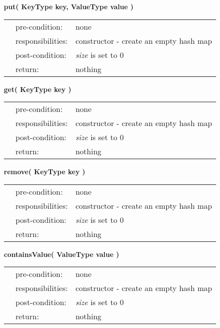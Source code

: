 \documentclass[12pt,letterpaper]{article}
\begin{document}
\textbf{put( KeyType key, ValueType value )} \\
\begin{listliketab} 
        \begin{tabular}{Lll}
            & pre-condition:    & none \\
            & responsibilities: & constructor - create an empty hash map \\
            & post-condition:   & \emph{size} is set to 0 \\
            & return:           & nothing
        \end{tabular} 
    \end{listliketab}
    
\textbf{get( KeyType key )} \\
\begin{listliketab} 
        \begin{tabular}{Lll}
            & pre-condition:    & none \\
            & responsibilities: & constructor - create an empty hash map \\
            & post-condition:   & \emph{size} is set to 0 \\
            & return:           & nothing
        \end{tabular} 
    \end{listliketab}
    
\textbf{remove( KeyType key )} \\
\begin{listliketab} 
        \begin{tabular}{Lll}
            & pre-condition:    & none \\
            & responsibilities: & constructor - create an empty hash map \\
            & post-condition:   & \emph{size} is set to 0 \\
            & return:           & nothing
        \end{tabular} 
    \end{listliketab}
    
\textbf{containsValue( ValueType value )} \\
\begin{listliketab} 
        \begin{tabular}{Lll}
            & pre-condition:    & none \\
            & responsibilities: & constructor - create an empty hash map \\
            & post-condition:   & \emph{size} is set to 0 \\
            & return:           & nothing
        \end{tabular}
    \end{listliketab}
    
\end{document}
